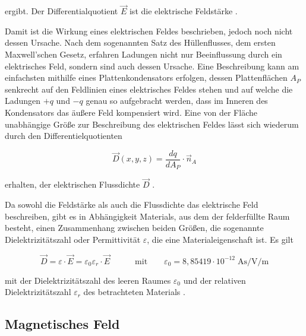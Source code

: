 ergibt. Der Differentialquotient $\vec E$ ist die elektrische Feldstärke \cite{EM_Schirmung}. \par
\vspace{\linespace}
Damit ist die Wirkung eines elektrischen Feldes beschrieben, jedoch noch nicht dessen Ursache. Nach dem sogenannten Satz des Hüllenflusses, dem ersten Maxwell'schen Gesetz, erfahren Ladungen nicht nur Beeinflussung durch ein elektrisches Feld, sondern sind auch dessen Ursache. Eine Beschreibung kann am einfachsten mithilfe eines Plattenkondensators erfolgen, dessen Plattenflächen $A_P$ senkrecht auf den Feldlinien eines elektrisches Feldes stehen und auf welche die Ladungen $+q$ und $-q$ genau so aufgebracht werden, dass im Inneren des Kondensators das äußere Feld kompensiert wird. Eine von der Fläche unabhängige Größe zur Beschreibung des elektrischen Feldes lässt sich wiederum durch den Differentielquotienten 

\begin{equation}
    \vec D(x,y,z) = \frac{dq}{dA_P} \cdot \vec n_A
\end{equation}

erhalten, der elektrischen Flussdichte $\vec D$ \cite{EM_Schirmung}. \par
\vspace{\linespace}

Da sowohl die Feldstärke als auch die Flussdichte das elektrische Feld beschreiben, gibt es in Abhängigkeit Materials, aus dem der felderfüllte Raum besteht, einen Zusammenhang zwischen beiden Größen, die sogenannte Dielektrizitätszahl oder Permittivität $\varepsilon$, die eine Materialeigenschaft ist. Es gilt

\begin{equation}
    \vec D = \varepsilon \cdot \vec E = \varepsilon_0 \varepsilon_r \cdot \vec E \qquad \quad \text{mit} \qquad \varepsilon_0 = 8,85419 \cdot 10^{-12} \; \si{\ampere\second\per\volt\per\meter}
    \label{eq:2_Materialgleichung_elektrisches_Feld}
\end{equation}

mit der Dielektrizitätszahl des leeren Raumes $\varepsilon_0$ und der relativen Dielektrizitätszahl $\varepsilon_r$ des betrachteten Materials \cite{EM_Schirmung}.


\subsection{Magnetisches Feld}\label{cha:2_sub_Magnetisches_Feld}

